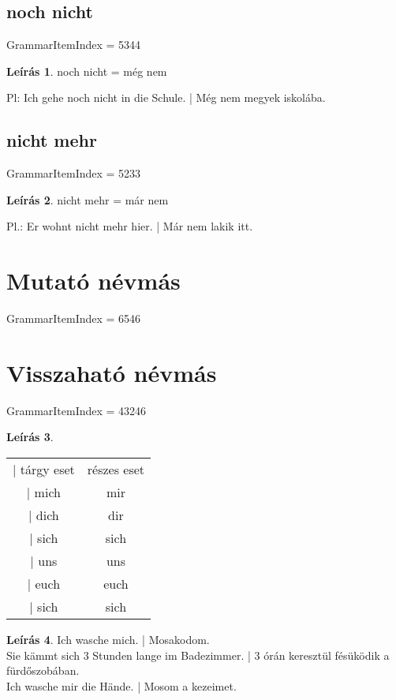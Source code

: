 \documentclass{article}
\theoremstyle{definition}
\newtheorem*{desc}{Leírás}
\begin{document}
\subsection{noch nicht}

GrammarItemIndex = 5344

\begin{desc}
noch nicht = még nem

Pl: Ich gehe noch nicht in die Schule. | Még nem megyek iskolába.
\end{desc}

\subsection{nicht mehr}

GrammarItemIndex = 5233

\begin{desc}
nicht mehr = már nem

Pl.: Er wohnt nicht mehr hier. | Már nem lakik itt.
\end{desc}

\section{Mutató névmás}

GrammarItemIndex = 6546

\section{Visszaható névmás}

GrammarItemIndex = 43246

\begin{desc}
\begin{tabular}{cc}
 | tárgy eset & részes eset \\
 | mich & mir \\
 | dich & dir \\
 | sich & sich \\
 | uns & uns \\
 | euch & euch \\
 | sich & sich \\
\end{tabular}
\end{desc}

\begin{desc}
Ich wasche mich. | Mosakodom. \\
Sie kämmt sich 3 Stunden lange im Badezimmer. | 3 órán keresztül fésüködik a fürdőszobában.\\
Ich wasche mir die Hände. | Mosom a kezeimet.
\end{desc}
\end{document}
